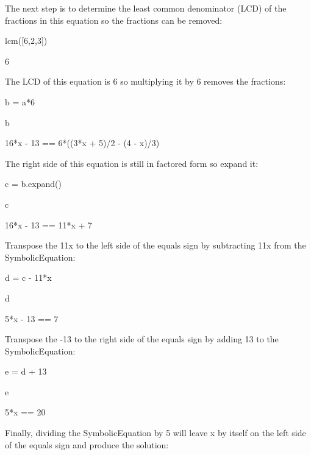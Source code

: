 \documentclass[12pt,oneside]{book}
\begin{document}
The next step is to determine the least common denominator (LCD) of the fractions in this equation so the fractions can be removed:

{\textquotedbl}{\textquotedbl}{\textquotedbl}

lcm([6,2,3])

{\textbar}

6


{\textquotedbl}{\textquotedbl}{\textquotedbl}

The LCD of this equation is 6 so multiplying it by 6 removes the fractions:

{\textquotedbl}{\textquotedbl}{\textquotedbl}

b = a*6

b

{\textbar}

16*x {}- 13 == 6*((3*x + 5)/2 {}- (4 {}- x)/3)


{\textquotedbl}{\textquotedbl}{\textquotedbl}

The right side of this equation is still in factored form so expand it:

{\textquotedbl}{\textquotedbl}{\textquotedbl}

c = b.expand()

c

{\textbar}

16*x {}- 13 == 11*x + 7


{\textquotedbl}{\textquotedbl}{\textquotedbl}

Transpose the 11x to the left side of the equals sign by subtracting 11x from the SymbolicEquation:

{\textquotedbl}{\textquotedbl}{\textquotedbl}

d = c {}- 11*x

d

{\textbar}

5*x {}- 13 == 7


{\textquotedbl}{\textquotedbl}{\textquotedbl}

Transpose the {}-13 to the right side of the equals sign by adding 13 to the SymbolicEquation:

{\textquotedbl}{\textquotedbl}{\textquotedbl}

e = d + 13

e

{\textbar}

5*x == 20


{\textquotedbl}{\textquotedbl}{\textquotedbl}

Finally, dividing the SymbolicEquation by 5 will leave x by itself on the left side of the equals sign and produce the solution:
\end{document}
